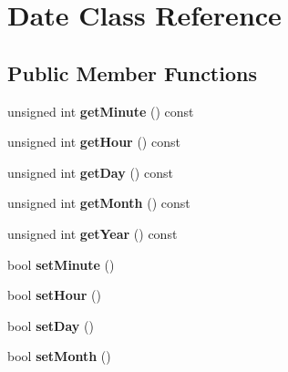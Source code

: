 \hypertarget{class_date}{\section{Date Class Reference}
\label{class_date}
}
\subsection*{Public Member Functions}
\begin{DoxyCompactItemize}
\item 
\hypertarget{class_date_ac770a597c5db01c15f5909d30ecc614d}{unsigned int {\bfseries get\+Minute} () const }\label{class_date_ac770a597c5db01c15f5909d30ecc614d}

\item 
\hypertarget{class_date_a7ec01c802e7fa66d0a3d301f14541de4}{unsigned int {\bfseries get\+Hour} () const }\label{class_date_a7ec01c802e7fa66d0a3d301f14541de4}

\item 
\hypertarget{class_date_a254204c492d3ebc26a2c62d532e34844}{unsigned int {\bfseries get\+Day} () const }\label{class_date_a254204c492d3ebc26a2c62d532e34844}

\item 
\hypertarget{class_date_ac471b901531b7a1e73809918bac8c1ec}{unsigned int {\bfseries get\+Month} () const }\label{class_date_ac471b901531b7a1e73809918bac8c1ec}

\item 
\hypertarget{class_date_a6561cf495bd6b7e6c747420d7ae9cc12}{unsigned int {\bfseries get\+Year} () const }\label{class_date_a6561cf495bd6b7e6c747420d7ae9cc12}

\item 
\hypertarget{class_date_a807ee40e5404da4ac414d7f8531d7b3b}{bool {\bfseries set\+Minute} ()}\label{class_date_a807ee40e5404da4ac414d7f8531d7b3b}

\item 
\hypertarget{class_date_a0e63d2302d3713242eba7ded2288cf3e}{bool {\bfseries set\+Hour} ()}\label{class_date_a0e63d2302d3713242eba7ded2288cf3e}

\item 
\hypertarget{class_date_a9202ce49cd9cb908d5de6b23a612d6bb}{bool {\bfseries set\+Day} ()}\label{class_date_a9202ce49cd9cb908d5de6b23a612d6bb}

\item 
\hypertarget{class_date_a18400dd2b0dbccc7951694342010e664}{bool {\bfseries set\+Month} ()}\label{class_date_a18400dd2b0dbccc7951694342010e664}


\end{DoxyCompactItemize}
